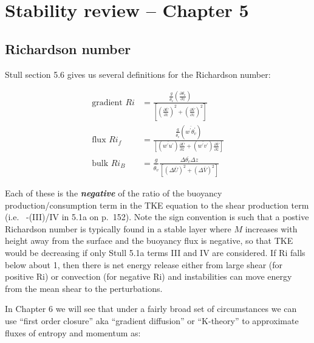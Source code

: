 \documentclass[11pt]{article}
\begin{document}
\section{Stability review -- Chapter 5}


\subsection{Richardson number}
\label{sec:richardson-number}

Stull section 5.6 gives us several definitions for
the Richardson number:


\begin{align}
  \label{eq:ri}
\text{gradient } Ri&= \frac{    \frac{ g }{\overline{\theta_v}} \left ( \frac{\partial \overline{  \theta_v} }{\partial z}  \right )  }%
{ \left [ \left ( \frac{ \partial \overline{ U}}{\partial z} \right )^2  + 
\left ( \frac{ \partial \overline{ V}}{\partial z} \right )^2  \right ]} \\
\text{flux }Ri_f&= \frac{    \frac{ g }{\overline{\theta_v}} \left ( \overline{ w^\prime \theta_v^\prime }   \right )  }%
{\left [ \left ( \overline{ w^\prime u^\prime } \right ) \frac{ \partial \overline{ U}}{\partial z}   + 
\left (\overline{ w^\prime v^\prime }\right ) \frac{ \partial \overline{ V}}{\partial z}   \right ]} \\
\text{bulk }Ri_B&=  \frac{ g }{\overline{\theta_v}} \frac{ \Delta \overline{\theta_v } \Delta z  }%
{ \left [ \left ( \Delta \overline{U } \right )^2 + \left ( \Delta \overline{V } \right )^2   \right ]}
\end{align}

Each of these is the \textit{\textbf{negative}} of the ratio of the buoyancy production/consumption
term in the TKE equation to the shear
production term (i.e.~ -(III)/IV in 5.1a on p.~152). Note the sign convention is such that 
a postive Richardson number is typically found in a stable layer where $M$ increases
with height away from the surface and the buoyancy flux is negative, so that TKE
would be decreasing if only Stull 5.1a terms III and IV are considered. 
If Ri falls below about 1, then there is net energy release either from
large shear (for positive Ri) or convection (for negative Ri)
and instabilities can move energy from the mean shear to the
perturbations.  

In Chapter 6 we will see that under a fairly broad set of circumstances we can use
``first order closure'' aka ``gradient diffusion'' or ``K-theory'' to approximate fluxes of entropy and momentum as:
\end{document}
